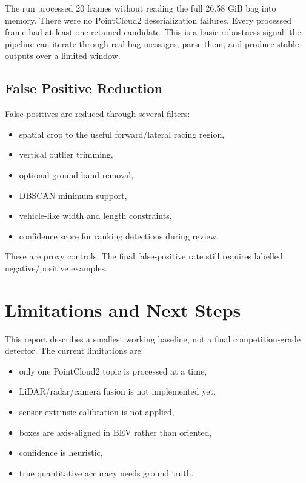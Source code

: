 \documentclass[11pt,a4paper]{article}
\begin{document}
The run processed 20 frames without reading the full 26.58 GiB bag into memory.
There were no PointCloud2 deserialization failures. Every processed frame had at
least one retained candidate. This is a basic robustness signal: the pipeline can
iterate through real bag messages, parse them, and produce stable outputs over a
limited window.

\subsection{False Positive Reduction}

False positives are reduced through several filters:

\begin{itemize}
  \item spatial crop to the useful forward/lateral racing region,
  \item vertical outlier trimming,
  \item optional ground-band removal,
  \item DBSCAN minimum support,
  \item vehicle-like width and length constraints,
  \item confidence score for ranking detections during review.
\end{itemize}

These are proxy controls. The final false-positive rate still requires labelled
negative/positive examples.

\section{Limitations and Next Steps}

This report describes a smallest working baseline, not a final competition-grade
detector. The current limitations are:

\begin{itemize}
  \item only one PointCloud2 topic is processed at a time,
  \item LiDAR/radar/camera fusion is not implemented yet,
  \item sensor extrinsic calibration is not applied,
  \item boxes are axis-aligned in BEV rather than oriented,
  \item confidence is heuristic,
  \item true quantitative accuracy needs ground truth.
\end{itemize}
\end{document}
